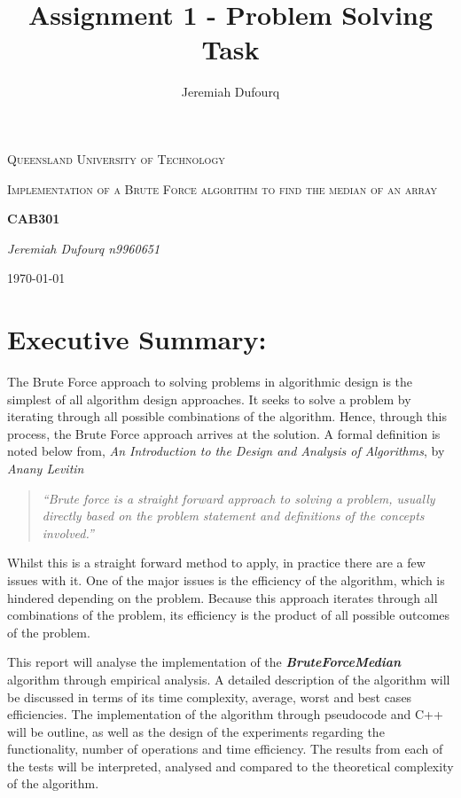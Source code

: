 \documentclass[12pt]{article}
\title{Assignment 1 - Problem Solving Task}
\author{Jeremiah Dufourq}
\begin{document}
\begin{titlepage}
	\centering
	
	
	{\scshape\LARGE Queensland University of Technology \par}
	\vspace{5cm}
	{\scshape\Large Implementation of a Brute Force algorithm to find the median of an array\par}
	\vspace{1.5cm}
	{\huge\bfseries CAB301\par}
	\vspace{2cm}
	{\Large\itshape Jeremiah Dufourq n9960651\par}
	
	{\large \today\par}
\end{titlepage}


\newpage
\tableofcontents
\newpage

\section{Executive Summary:}
The Brute Force approach to solving problems in algorithmic design is the simplest of all algorithm design approaches. It seeks to solve a problem by iterating through all possible combinations of the algorithm. Hence, through this process, the Brute Force approach arrives at the solution. A formal definition is noted below from, \textit{An Introduction to the Design and Analysis of Algorithms}, by \textit{Anany Levitin} \cite{RN1}
\begin{quotation}
	\textit{“Brute force is a straight forward approach to solving a problem, usually directly based on the problem statement and definitions of the concepts involved.”}
	
\end{quotation}

Whilst this is a straight forward method to apply, in practice there are a few issues with it. One of the major issues is the efficiency of the algorithm, which is hindered depending on the problem. Because this approach iterates through all combinations of the problem, its efficiency is the product of all possible outcomes of the problem.

This report will analyse the implementation of the \textbf{\textit{BruteForceMedian}} algorithm through empirical analysis. A detailed description of the algorithm will be discussed in terms of its time complexity, average, worst and best cases efficiencies. The implementation of the algorithm through pseudocode and C++ will be outline, as well as the design of the experiments regarding the functionality, number of operations and time efficiency. The results from each of the tests will be interpreted, analysed and compared to the theoretical complexity of the algorithm.
\end{document}
